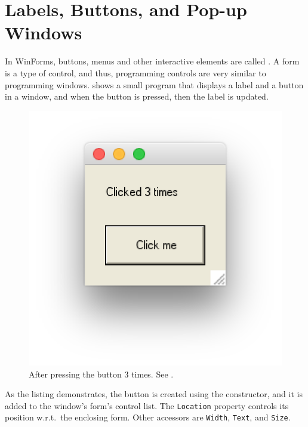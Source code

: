 \documentclass[fsharpNotes.tex]{subfiles}
\begin{document}
\section{Labels, Buttons, and Pop-up Windows}
In WinForms, buttons, menus and other interactive elements are called . A form is a type of control, and thus, programming controls are very similar to programming windows.  shows a small program that displays a label and a button in a window, and when the button is pressed, then the label is updated.
%
%
\begin{figure}
  \centering
  \includegraphics[scale=0.3]{buttonControl}
  \caption{After pressing the button 3 times. See .}
  \label{fig:buttonControl}
\end{figure}
%
As the listing demonstrates, the button is created using the  constructor, and it is added to the window's form's control list. The \lstinline{Location} property controls its position w.r.t.\ the enclosing form. Other accessors are \lstinline{Width}, \lstinline{Text}, and \lstinline{Size}.
\end{document}
